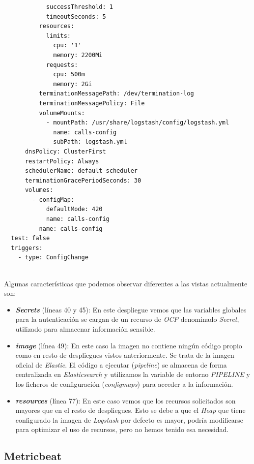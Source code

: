 \begin{verbatim}
            successThreshold: 1
            timeoutSeconds: 5
          resources:
            limits:
              cpu: '1'
              memory: 2200Mi
            requests:
              cpu: 500m
              memory: 2Gi
          terminationMessagePath: /dev/termination-log
          terminationMessagePolicy: File
          volumeMounts:
            - mountPath: /usr/share/logstash/config/logstash.yml
              name: calls-config
              subPath: logstash.yml
      dnsPolicy: ClusterFirst
      restartPolicy: Always
      schedulerName: default-scheduler
      terminationGracePeriodSeconds: 30
      volumes:
        - configMap:
            defaultMode: 420
            name: calls-config
          name: calls-config
  test: false
  triggers:
    - type: ConfigChange
 
\end{verbatim}

 Algunas características que podemos observar diferentes a las vistas actualmente son: 
 
 \begin{itemize}
 \item \textit{\textbf{Secrets}} (líneas 40 y 45): En este despliegue vemos que las variables globales para la autenticación se cargan de un recurso de \textit{OCP} denominado \textit{Secret}, utilizado para almacenar información sensible.
 \item  \textit{\textbf{image}} (línea 49): En este caso la imagen no contiene ningún código propio como en resto de despliegues vistos anteriormente. Se trata de la imagen oficial de \textit{Elastic}. El código a ejecutar (\textit{pipeline}) se almacena de forma centralizada en \textit{Elasticsearch} y utilizamos la variable de entorno \textit{PIPELINE} y los ficheros de configuración (\textit{configmaps}) para acceder a la información. 
 \item \textit{\textbf{resources}} (línea 77): En este caso vemos que los recursos solicitados son mayores que en el resto de despliegues. Esto se debe a que el \textit{Heap} que tiene configurado la imagen de \textit{Logstash} por defecto es mayor, podría modificarse para optimizar el uso de recursos, pero no hemos tenido esa necesidad.
 \end{itemize}



\subsection{Metricbeat}

